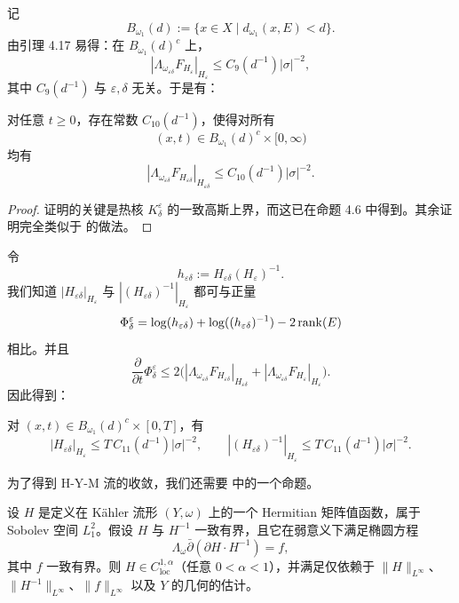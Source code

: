 记
\[
B_{\omega_1}(d):=\{x\in X\mid d_{\omega_1}(x,E)<d\}.
\]
由引理 4.17 易得：在 \(B_{\omega_1}(d)^c\) 上，
\[
|\Lambda_{\omega_{\varepsilon\delta}}F_{H_{\varepsilon}}|_{H_{\varepsilon}}
\le C_9(d^{-1})|\sigma|^{-2},
\]
其中 \(C_9(d^{-1})\) 与 \(\varepsilon,\delta\) 无关。于是有：

\begin{lemma}
对任意 \(t\ge 0\)，存在常数 \(C_{10}(d^{-1})\)，使得对所有
\[
(x,t)\in B_{\omega_1}(d)^c\times [0,\infty)
\]
均有
\[
|\Lambda_{\omega_{\varepsilon\delta}}F_{H_{\varepsilon\delta}}|_{H_{\varepsilon\delta}}
\le
C_{10}(d^{-1})|\sigma|^{-2}.
\]
\end{lemma}

\begin{proof}
证明的关键是热核 \(K^\varepsilon_\delta\) 的一致高斯上界，而这已在命题 4.6 中得到。其余证明完全类似于 \cite[Lemma 2.2]{Li-Zh-Zh} 的做法。
\end{proof}

令
\[
h_{\varepsilon\delta}:=H_{\varepsilon\delta} (H_{\varepsilon})^{-1}.
\]
我们知道 \(|H_{\varepsilon\delta}|_{H_{\varepsilon}}\) 与 \(|(H_{\varepsilon\delta})^{-1}|_{H_{\varepsilon}}\) 都可与正量
\[
\Phi^\varepsilon_\delta
=
\log(h_{\varepsilon\delta})+\log((h_{\varepsilon\delta})^{-1})-2\operatorname{rank}(E)
\]
相比。并且
\[
\frac{\partial}{\partial t}\Phi^\varepsilon_\delta
\le
2\bigl(
|\Lambda_{\omega_{\varepsilon\delta}}F_{H_{\varepsilon\delta}}|_{H_{\varepsilon\delta}}
+
|\Lambda_{\omega_{\varepsilon\delta}}F_{H_{\varepsilon}}|_{H_{\varepsilon}}
\bigr). \tag{24}
\]
因此得到：

\begin{lemma}
对 \((x,t)\in B_{\omega_1}(d)^c\times [0,T]\)，有
\[
|H_{\varepsilon\delta}|_{H_{\varepsilon}}\le T\,C_{11}(d^{-1})|\sigma|^{-2},
\qquad
|(H_{\varepsilon\delta})^{-1}|_{H_{\varepsilon}}\le T\,C_{11}(d^{-1})|\sigma|^{-2}.
\]
\end{lemma}

为了得到 H-Y-M 流的收敛，我们还需要 \cite[Proposition 1]{B-S} 中的一个命题。

\begin{proposition}
设 \(H\) 是定义在 Kähler 流形 \((Y,\omega)\) 上的一个 Hermitian 矩阵值函数，属于 Sobolev 空间 \(L_1^2\)。假设 \(H\) 与 \(H^{-1}\) 一致有界，且它在弱意义下满足椭圆方程
\[
\Lambda_\omega \bar\partial(\partial H\cdot H^{-1})=f,
\]
其中 \(f\) 一致有界。则 \(H\in C_{\mathrm{loc}}^{1,\alpha}\)（任意 \(0<\alpha<1\)），并满足仅依赖于 \(\|H\|_{L^\infty}\)、\(\|H^{-1}\|_{L^\infty}\)、\(\|f\|_{L^\infty}\) 以及 \(Y\) 的几何的估计。
\end{proposition}

